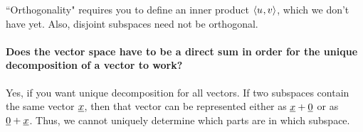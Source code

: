 \documentclass[10pt,english]{article}
\begin{document}
``Orthogonality" requires you to define an inner product ${\langle  u  \mskip1mu ,  v  \rangle}$, which we don't have yet.
Also, disjoint subspaces need not be orthogonal.

\paragraph{Does the vector space have to be a direct sum in order for the unique decomposition of a vector to work?}

Yes, if you want unique decomposition for all vectors.
If two subspaces contain the same vector $\underline{x}$, then that vector can be represented either as $\underline{x} + \underline{0}$ or as $\underline{0} + \underline{x}$.
Thus, we cannot uniquely determine which parts are in which subspace.
\end{document}
